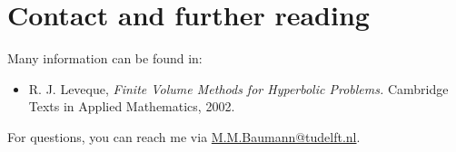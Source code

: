 \documentclass[a4paper,10pt]{article}
\begin{document}
\section*{Contact and further reading}
Many information can be found in:
\begin{itemize}
 \item R. J. Leveque, \textit{Finite Volume Methods for Hyperbolic Problems.} Cambridge Texts in Applied Mathematics, 2002.
\end{itemize}
For questions, you can reach me via \href{mailto:M.M.Baumann@tudelft.nl}{M.M.Baumann@tudelft.nl}.
\end{document}
